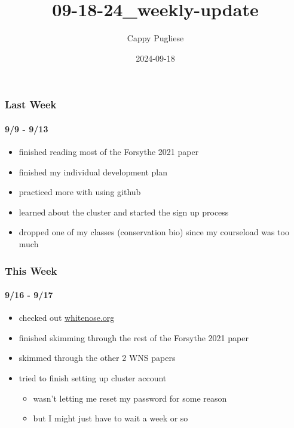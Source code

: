 \documentclass[
]{article}
\title{09-18-24\_weekly-update}
\author{Cappy Pugliese}
\date{2024-09-18}
\providecommand{\tightlist}{%
  \setlength{\itemsep}{0pt}\setlength{\parskip}{0pt}}
\begin{document}
\maketitle

\hypertarget{last-week}{%
\subsubsection{Last Week}\label{last-week}}

\hypertarget{section}{%
\paragraph{9/9 - 9/13}\label{section}}

\begin{itemize}
\tightlist
\item
  finished reading most of the Forsythe 2021 paper
\item
  finished my individual development plan
\item
  practiced more with using github
\item
  learned about the cluster and started the sign up process
\item
  dropped one of my classes (conservation bio) since my courseload was
  too much
\end{itemize}

\hypertarget{this-week}{%
\subsubsection{This Week}\label{this-week}}

\hypertarget{section-1}{%
\paragraph{9/16 - 9/17}\label{section-1}}

\begin{itemize}
\tightlist
\item
  checked out \href{https://www.whitenosesyndrome.org/}{whitenose.org}
\item
  finished skimming through the rest of the Forsythe 2021 paper
\item
  skimmed through the other 2 WNS papers
\item
  tried to finish setting up cluster account

  \begin{itemize}
  \tightlist
  \item
    wasn't letting me reset my password for some reason
  \item
    but I might just have to wait a week or so
  \end{itemize}
\end{itemize}
\end{document}
